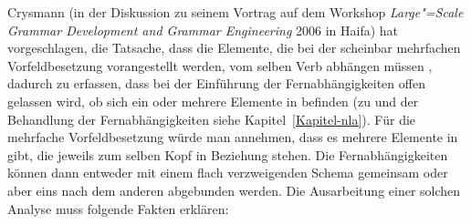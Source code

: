 Crysmann (in der Diskussion zu seinem Vortrag auf dem Workshop \emph{Large"=Scale Grammar Development and Grammar Engineering} 
2006 in Haifa) hat vorgeschlagen, die Tatsache, dass die Elemente, die bei der scheinbar mehrfachen Vorfeldbesetzung
vorangestellt werden, vom selben Verb abhängen müssen \citep[]{Fanselow93a}, dadurch zu erfassen, dass bei der Einführung
der Fernabhängigkeiten offen gelassen wird, ob sich ein oder mehrere Elemente in \slasch befinden
(zu \slasch und der Behandlung der Fernabhängigkeiten siehe Kapitel~\ref{Kapitel-nla}).
Für die mehrfache Vorfeldbesetzung würde man annehmen, dass es mehrere Elemente in \slasch gibt,
die jeweils zum selben Kopf in Beziehung stehen. Die Fernabhängigkeiten können dann entweder mit einem
flach verzweigenden Schema gemeinsam oder aber eins nach dem anderen abgebunden werden.
Die Ausarbeitung einer solchen Analyse muss folgende Fakten erklären:
